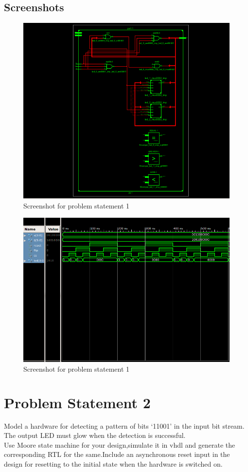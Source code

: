 \documentclass[11pt]{report}
\begin{document}
\subsection{Screenshots}
	\begin{figure}[h!]
	\centering
	\includegraphics[scale=0.8, center]{images/screenshot11}
	\caption{Screenshot for problem statement 1}
	\end{figure}
	\begin{figure}[h!]
	\centering
	\includegraphics[scale=0.8, center]{images/screenshot12}
	\caption{Screenshot for problem statement 1}
	\end{figure}
	\pagebreak
\section{Problem Statement 2}
Model a hardware for detecting a pattern of bits ‘11001’ in the input bit stream. The output LED must glow when the detection is successful.\\
Use Moore state machine for your design,simulate it in vhdl and generate the corresponding RTL for the same.Include an asynchronous reset input in the design for resetting to the initial state when the hardware is switched on.\\
\end{document}
